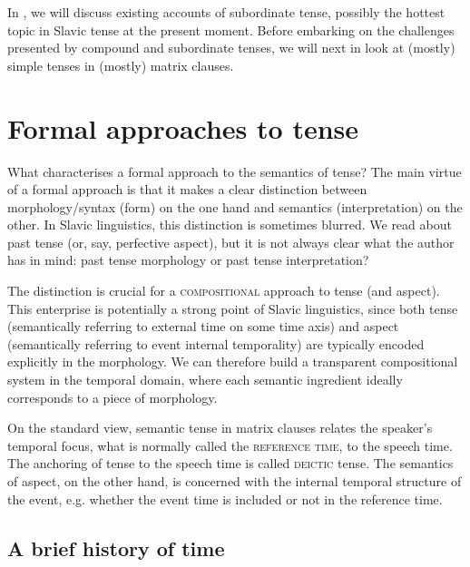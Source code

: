 \documentclass[output=paper,colorlinks,citecolor=brown]{langscibook}
\begin{document}
In , we will  discuss existing accounts of subordinate tense, possibly the hottest topic in Slavic tense at the present moment. 
Before embarking on the challenges presented by compound and subordinate tenses, we will next in   look at (mostly) simple tenses in (mostly) matrix clauses.


\section{Formal approaches to tense}\label{sec:2}
What characterises a formal approach to the semantics of tense? The main virtue of a formal approach is that it makes a clear distinction between mor\-phol\-o\-gy/syn\-tax (form) on the one hand and semantics (interpretation) on the other. In Slavic linguistics, this distinction is sometimes blurred. We read about past tense (or, say, perfective aspect), but it is not always  clear what the author has in mind: past tense morphology or past tense interpretation? 

The distinction is crucial for a \textsc{compositional} approach to tense (and aspect). This enterprise is potentially a strong point of Slavic linguistics, since  both tense (semantically referring to external time on some time axis) and aspect (semantically referring to  event internal temporality) are typically encoded explicitly in the morphology. We can therefore build a transparent compositional system in the temporal domain, where each semantic ingredient ideally corresponds to a piece of morphology.

On the standard view, semantic tense in matrix clauses relates the speaker's temporal focus, what is normally called the \textsc{reference time},  to the speech time. The anchoring of tense to the speech time is called \textsc{deictic} tense. The semantics of aspect, on the other hand, is concerned with the internal temporal structure of the event, e.g. whether the event time is included or not in the reference time. 



\subsection{A brief history of time}
\end{document}
